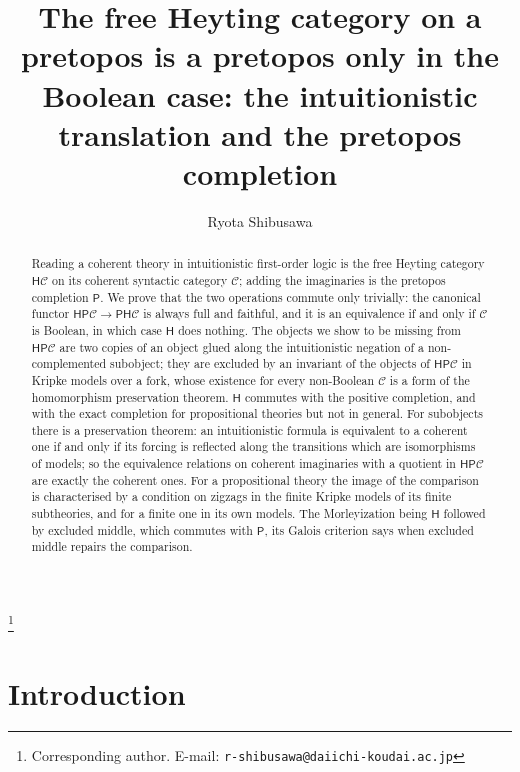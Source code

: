 \documentclass[11pt]{amsart}
\theoremstyle{definition}
\newcommand{\PP}{\mathsf P}
\newcommand{\HH}{\mathsf H}
\newcommand{\cC}{\mathcal C}
\begin{document}
\title[The free Heyting category on a pretopos]{The free Heyting category on a pretopos is a pretopos only in the Boolean case: the intuitionistic translation and the pretopos completion}
\author{Ryota Shibusawa}
\thanks{Corresponding author. E-mail: \texttt{r-shibusawa@daiichi-koudai.ac.jp}}
\address{Daiichi Institute of Technology}

\begin{abstract}
Reading a coherent theory in intuitionistic first-order logic is the
free Heyting category $\HH\cC$ on its coherent syntactic category
$\cC$; adding the imaginaries is the pretopos completion $\PP$. We
prove that the two operations commute only trivially: the canonical
functor $\HH\PP\cC\to\PP\HH\cC$ is always full and faithful, and it is
an equivalence if and only if $\cC$ is Boolean, in which case $\HH$
does nothing. The objects we show to be
missing from $\HH\PP\cC$ are two copies of an object glued along the intuitionistic negation of a
non-complemented subobject; they are excluded by an invariant of the
objects of $\HH\PP\cC$ in Kripke models over a fork, whose existence
for every non-Boolean $\cC$ is a form of the homomorphism preservation
theorem. $\HH$ commutes with the positive completion, and with the exact
completion for propositional theories but not in general. For subobjects there is a preservation theorem: an
intuitionistic formula is equivalent to a coherent one if and only if its forcing is
reflected along the transitions which are isomorphisms of models; so
the equivalence relations on coherent imaginaries with a quotient in
$\HH\PP\cC$ are exactly the coherent ones. For a propositional theory the image of the comparison is
characterised by a condition on zigzags in the finite Kripke models of
its finite subtheories, and for a finite one in its own models. The Morleyization being
$\HH$ followed by excluded middle, which commutes with $\PP$, its
Galois criterion says when excluded middle repairs the comparison.
\end{abstract}

\maketitle

\section{Introduction}
\end{document}
